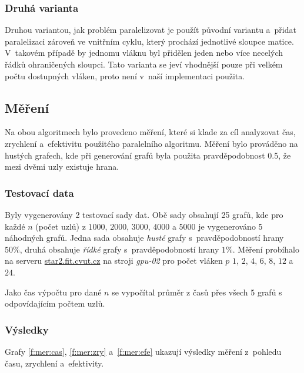 \subsubsection{Druhá varianta}
Druhou variantou, jak problém paralelizovat je použít původní variantu a~přidat paralelizaci zároveň ve vnitřním cyklu, který prochází jednotlivé sloupce matice. V~takovém případě by jednomu vláknu byl přidělen jeden nebo více necelých řádků ohraničených sloupci. Tato varianta se jeví vhodnější pouze při velkém počtu dostupných vláken, proto není v~naší implementaci použita.


\subsection{Měření}
Na obou algoritmech bylo provedeno měření, které si klade za cíl analyzovat čas, zrychlení a~efektivitu použitého paralelního algoritmu. Měření bylo prováděno na hustých grafech, kde při generování grafů byla použita pravděpodobnost 0.5, že mezi dvěmi uzly existuje hrana.

\subsubsection{Testovací data}
Byly vygenerovány 2 testovací sady dat. Obě sady obsahují 25 grafů, kde pro každé $n$ (počet uzlů) z $1000$, $2000$, $3000$, $4000$ a $5000$ 
je vygenerováno 5 náhodných grafů. Jedna sada obsahuje \emph{husté} grafy s~pravděpodobností hrany $50 \%$, druhá obsahuje \emph{řídké} grafy
s~pravděpodobností hrany $1 \%$.
Měření probíhalo na serveru \url{star2.fit.cvut.cz} na stroji \textit{gpu-02} pro počet vláken $p$ $1$, $2$, $4$, $6$, $8$, $12$ a $24$.

Jako čas výpočtu pro dané $n$ se vypočítal průměr z časů přes všech 5 grafů s odpovídajícím počtem uzlů.

\subsubsection{Výsledky}
Grafy \ref{f:mer:cas}, \ref{f:mer:zry} a~\ref{f:mer:efe} ukazují výsledky měření z~pohledu času, zrychlení a~efektivity.

